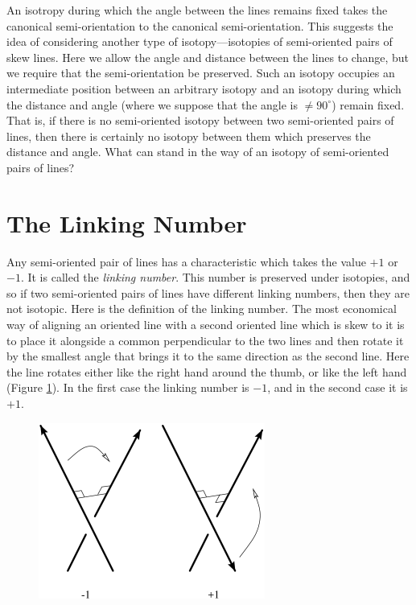 \documentclass{article}
\begin{document}
An isotropy during which the angle between the lines remains fixed takes the
canonical semi-orientation to the canonical semi-orientation. This suggests the
idea of considering another type of isotopy---isotopies of semi-oriented pairs
of skew lines. Here we allow the angle and distance between the lines to change,
but we require that the semi-orientation be preserved. Such an isotopy occupies
an intermediate position between an arbitrary isotopy and an isotopy during
which the distance and angle (where we suppose that the angle is
$\not=90^\circ$) remain fixed. That is, if there is no semi-oriented isotopy
between two semi-oriented pairs of lines, then there is certainly no isotopy
between them which preserves the distance and angle. What can stand in the way
of an isotopy of semi-oriented pairs of lines?
\section{The Linking Number}

Any semi-oriented pair of lines has a characteristic which takes the value $+1$
or $-1$. It is called the {\em linking number\/}. This number is
preserved under isotopies, and so if two semi-oriented pairs of lines have
different linking numbers, then they are not isotopic. Here is the
definition of the linking number. The most economical way of aligning an
oriented line with a second oriented line which is skew to it is to place it
alongside a common perpendicular to the two lines and then rotate it by the
smallest angle that brings it to the same direction as the second line. Here
the line rotates either like the right hand around the thumb, or like the left
hand (Figure \ref{f5}). In the first case the linking number is $-1$, 
and in the
second case it is $+1$.

\begin{figure} 
{\includegraphics{imagesSkewlines/x5.png}}
\caption{}
\label{f5}
\end{figure}
\end{document}
